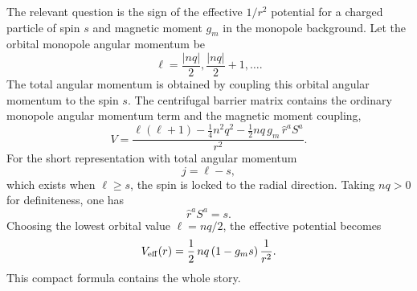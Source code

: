 \documentclass[11pt]{article}
\begin{document}
The relevant question is the sign of the effective $1/r^2$ potential for a charged particle of spin $s$ and magnetic moment $g_m$ in the monopole background.  Let the orbital monopole angular momentum be
\begin{equation}
  \ell=\frac{|nq|}{2},\frac{|nq|}{2}+1,\dots .
\end{equation}
The total angular momentum is obtained by coupling this orbital angular momentum to the spin $s$.  The centrifugal barrier matrix contains the ordinary monopole angular momentum term and the magnetic moment coupling,
\begin{equation}
  V=\frac{\ell(\ell+1)-\frac14 n^2q^2-\frac12 nq\,g_m\,\widehat r^a S^a}{r^2} .
  \label{eq:generalSpinMonopolePotential}
\end{equation}
For the short representation with total angular momentum
\begin{equation}
  j=\ell-s,
\end{equation}
which exists when $\ell\ge s$, the spin is locked to the radial direction.  Taking $nq>0$ for definiteness, one has
\begin{equation}
  \widehat r^aS^a=s .
\end{equation}
Choosing the lowest orbital value $\ell=nq/2$, the effective potential becomes
\begin{equation}
  V_{\rm eff}(r)=\frac{1}{2}\,nq\,(1-g_m s)\,\frac{1}{r^2} .
  \label{eq:shortRepPotential}
\end{equation}
This compact formula contains the whole story.
\end{document}
